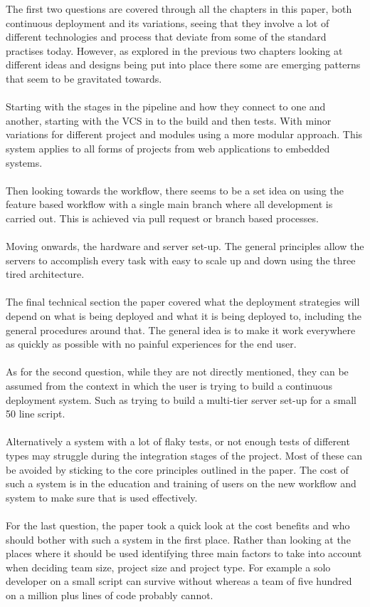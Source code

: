 The first two questions are covered through all the chapters in this paper, both continuous deployment and its variations, seeing that they involve a lot of different technologies and process that deviate from some of the standard practises today. However, as explored in the previous two chapters looking at different ideas and designs being put into place there some are emerging patterns that seem to be gravitated towards.
\\\\
Starting with the stages in the pipeline and how they connect to one and another, starting with the VCS in to the build and then tests. With minor variations for different project and modules using a more modular approach. This system applies to all forms of projects from web applications to embedded systems.
\\\\
Then looking towards the workflow, there seems to be a set idea on using the feature based workflow with a single main branch where all development is carried out. This is achieved via pull request or branch based processes.
\\\\
Moving onwards, the hardware and server set-up. The general principles allow the servers to accomplish every task with easy to scale up and down using the three tired architecture.
\\\\
The final technical section the paper covered what the deployment strategies will depend on what is being deployed and what it is being deployed to, including the general procedures around that. The general idea is to make it work everywhere as quickly as possible with no painful experiences for the end user.
\\\\
As for the second question, while they are not directly mentioned, they can be assumed from the context in which the user is trying to build a continuous deployment system. Such as trying to build a multi-tier server set-up for a small 50 line script. 
\\\\
Alternatively a system with a lot of flaky tests, or not enough tests of different types may struggle during the integration stages of the project. Most of these can be avoided by sticking to the core principles outlined in the paper. The cost of such a system is in the education and training of users on the new workflow and system to make sure that is used effectively.
\\\\
For the last question, the paper took a quick look at the cost benefits and who should bother with such a system in the first place. Rather than looking at the places where it should be used identifying three main factors to take into account when deciding team size, project size and project type. For example a solo developer on a small script can survive without whereas a team of five hundred on  a million plus lines of code probably cannot.


